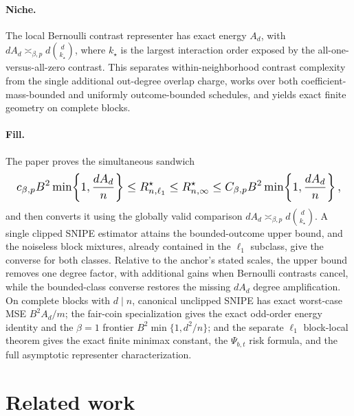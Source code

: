 \documentclass{article}
\begin{document}
\paragraph{Niche.} The local Bernoulli contrast representer has exact energy \(A_d\), with \(dA_d\asymp_{\beta,p}d\binom d{k_\star}\), where \(k_\star\) is the largest interaction order exposed by the all-one-versus-all-zero contrast. This separates within-neighborhood contrast complexity from the single additional out-degree overlap charge, works over both coefficient-mass-bounded and uniformly outcome-bounded schedules, and yields exact finite geometry on complete blocks.

\paragraph{Fill.} The paper proves the simultaneous sandwich
\[
\makebox[\linewidth][c]{\resizebox{0.98\linewidth}{!}{\(\displaystyle c_{\beta,p}B^2\min\!\left\{1,\frac{dA_d}{n}\right\}
\le R_{n,\ell_1}^\star\le R_{n,\infty}^\star
\le C_{\beta,p}B^2\min\!\left\{1,\frac{dA_d}{n}\right\},\)}}
\]
and then converts it using the globally valid comparison \(dA_d\asymp_{\beta,p}d\binom d{k_\star}\). A single clipped SNIPE estimator attains the bounded-outcome upper bound, and the noiseless block mixtures, already contained in the \(\ell_1\) subclass, give the converse for both classes. Relative to the anchor's stated scales, the upper bound removes one degree factor, with additional gains when Bernoulli contrasts cancel, while the bounded-class converse restores the missing \(dA_d\) degree amplification. On complete blocks with \(d\mid n\), canonical unclipped SNIPE has exact worst-case MSE \(B^2A_d/m\); the fair-coin specialization gives the exact odd-order energy identity and the \(\beta=1\) frontier \(B^2\min\{1,d^2/n\}\); and the separate \(\ell_1\) block-local theorem gives the exact finite minimax constant, the \(\Psi_{b,t}\) risk formula, and the full asymptotic representer characterization.

\section{Related work}
\end{document}
